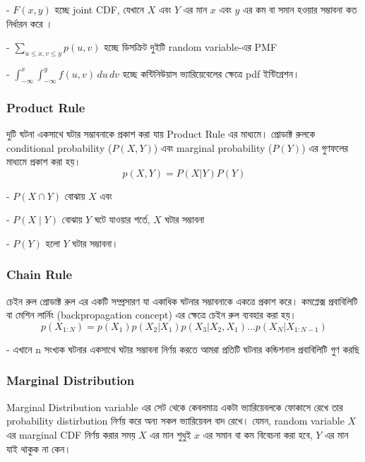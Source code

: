 \documentclass[graybox, envcountchap, twocolumn]{styles/svmult}
\begin{document}
-  $F(x, y)$ { \bengalifont হচ্ছে joint CDF, {\bengalifont যেখানে  $X$ এবং $Y$ এর মান $x$ এবং $y$ এর কম বা সমান হওয়ার সম্ভাবনা কত নির্ধারন করে ।}}

-  $\sum_{u \leq x, v \leq y} p(u, v)$ {\bengalifont হচ্ছে ডিসক্রিট দুইটি random variable-এর PMF}

-  $\int_{-\infty}^{x} \int_{-\infty}^{y} f(u, v) \, du \, dv$ {\bengalifont হচ্ছে কন্টিনিউয়াস ভ্যারিয়েবেলের ক্ষেত্রে pdf ইন্টিগ্রেশন।}


\subsubsection{Product Rule}

 {\bengalifont দুটি ঘটনা একসাথে ঘটার সম্ভাবনাকে প্রকাশ করা যায় Product Rule এর মাধ্যমে।  প্রোডাক্ট রুলকে conditional probability ($P(X,Y)$) এবং marginal probability ($P(Y)$) এর গুণফলের মাধ্যমে প্রকাশ করা হয়।   }
\begin{equation}\label{eqn:product-rule}
p(X,Y) = P(X|Y) P(Y)
\end{equation} 


-   $P(X \cap Y)$ {\bengalifont বোঝায়} $X$ {\bengalifont এবং} 

-   $P(X \mid Y)$ {\bengalifont বোঝায়} $Y$ {\bengalifont ঘটে যাওয়ার শর্তে,} $X$ {\bengalifont ঘটার সম্ভাবনা} 

-   $P(Y)$ {\bengalifont হলো} $Y$ {\bengalifont ঘটার সম্ভাবনা।}


\subsubsection{Chain Rule}
{\bengalifont চেইন রুল প্রোডাক্ট রুল এর একটি সম্প্রসারণ যা একাধিক ঘটনার সম্ভাবনাকে একত্রে প্রকাশ করে। কমপ্লেক্স প্রবাবিলিটি বা মেশিন লার্নিং (backpropagation concept) এর ক্ষেত্রে চেইন রুল ব্যবহার করা হয়। }
\begin{equation}
p(X_{1:N}) = p(X_1)p(X_2|X_1)p(X_3|X_2,X_1)...p(X_N|X_{1:N-1})
\label{eq:1}
\end{equation}



-   {\bengalifont এখানে 
    n সংখ্যক ঘটনার একসাথে ঘটার সম্ভাবনা নির্ণয় করতে আমরা প্রতিটি ঘটনার কন্ডিশনাল প্রবাবিলিটি গুণ করছি }



\subsubsection{Marginal Distribution} {\bengalifont Marginal Distribution variable এর সেট থেকে কেবলমাত্র একটা ভ্যারিয়েবলকে ফোকাসে রেখে তার probability distirbution নির্ণয় করে অন্য সকল ভ্যারিয়েবল বাদ রেখে।  যেমন, random variable $X$ এর marginal CDF নির্ণয় করার সময় $X$ এর মান শুধুই $x$ এর সমান বা কম বিবেচনা করা হবে, $Y$ এর মান যাই থাকুক না কেন।  }
\end{document}
